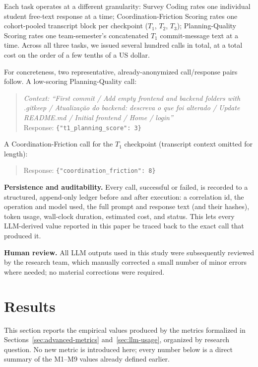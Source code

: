 \documentclass[conference]{IEEEtran}
\begin{document}
Each task operates at a different granularity: Survey Coding rates one
individual student free-text response at a time; Coordination-Friction
Scoring rates one cohort-pooled transcript block per checkpoint ($T_1$,
$T_2$, $T_3$); Planning-Quality Scoring rates one team-semester's
concatenated $T_1$ commit-message text at a time. Across all three tasks, we
issued several hundred calls in total, at a total cost on the order of a few
tenths of a US dollar.

For concreteness, two representative, already-anonymized call/response pairs
follow. A low-scoring Planning-Quality call:
\begin{quote}
\small
\emph{Context: ``First commit / Add empty frontend and backend folders with
.gitkeep / Atualiza\c{c}\~{a}o do backend: descreva o que foi alterado /
Update README.md / Initial frontend / Home / login''} \\
Response: \texttt{\{"t1\_planning\_score": 3\}}
\end{quote}
A Coordination-Friction call for the $T_1$ checkpoint (transcript context
omitted for length):
\begin{quote}
\small
Response: \texttt{\{"coordination\_friction": 8\}}
\end{quote}

\textbf{Persistence and auditability.} Every call, successful or failed, is
recorded to a structured, append-only ledger before and after execution:
a correlation id, the operation and model used, the full prompt and response
text (and their hashes), token usage, wall-clock duration, estimated cost,
and status. This lets every LLM-derived value reported in this paper be
traced back to the exact call that produced it.

\textbf{Human review.} All LLM outputs used in this study were subsequently
reviewed by the research team, which manually corrected a small number of
minor errors where needed; no material corrections were required.

\section{Results}
\label{sec:results}

This section reports the empirical values produced by the metrics
formalized in Sections~\ref{sec:advanced-metrics} and~\ref{sec:llm-usage},
organized by research question. No new metric is introduced here; every
number below is a direct summary of the M1--M9 values already defined
earlier.
\end{document}
